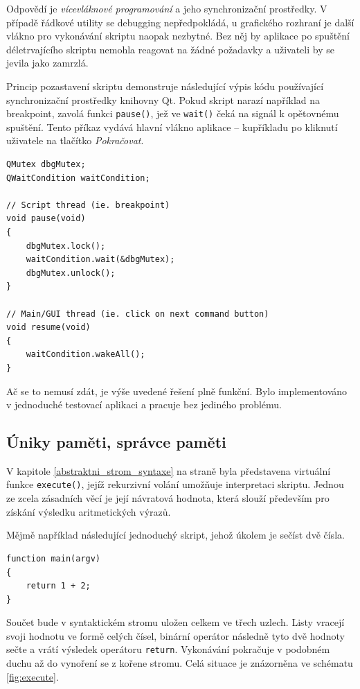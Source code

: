 \documentclass[11pt,twoside,a4paper]{book}
\begin{document}
Odpovědí je \textit{vícevláknové programování} a jeho synchronizační prostředky. V případě řádkové utility se debugging nepředpokládá, u grafického rozhraní je další vlákno pro vykonávání skriptu naopak nezbytné. Bez něj by aplikace po spuštění déletrvajícího skriptu nemohla reagovat na žádné požadavky a uživateli by se jevila jako zamrzlá.

Princip pozastavení skriptu demonstruje následující výpis kódu používající synchronizační prostředky knihovny Qt. Pokud skript narazí například na breakpoint, zavolá funkci \texttt{pause()}, jež ve \texttt{wait()} čeká na signál k opětovnému spuštění. Tento příkaz vydává hlavní vlákno aplikace -- kupříkladu po kliknutí uživatele na tlačítko \textit{Pokračovat}.

\begin{verbatim}
QMutex dbgMutex;
QWaitCondition waitCondition;

// Script thread (ie. breakpoint)
void pause(void)
{
    dbgMutex.lock();
    waitCondition.wait(&dbgMutex);
    dbgMutex.unlock();
}

// Main/GUI thread (ie. click on next command button)
void resume(void)
{
    waitCondition.wakeAll();
}
\end{verbatim}

Ač se to nemusí zdát, je výše uvedené řešení plně funkční. Bylo implementováno v jednoduché testovací aplikaci a pracuje bez jediného problému.


\subsection{Úniky paměti, správce paměti}

V kapitole \ref{abstraktni_strom_syntaxe} na straně \pageref{abstraktni_strom_syntaxe} byla představena virtuální funkce \texttt{execute()}, jejíž rekurzivní volání umožňuje interpretaci skriptu. Jednou ze zcela zásadních věcí je její návratová hodnota, která slouží především pro získání výsledku aritmetických výrazů.

Mějmě například následující jednoduchý skript, jehož úkolem je sečíst dvě čísla.

\begin{verbatim}
function main(argv)
{
    return 1 + 2;
}
\end{verbatim}

Součet bude v syntaktickém stromu uložen celkem ve třech uzlech. Listy vracejí svoji hodnotu ve formě celých čísel, binární operátor následně tyto dvě hodnoty sečte a vrátí výsledek operátoru \texttt{return}. Vykonávání pokračuje v podobném duchu až do vynoření se z kořene stromu. Celá situace je znázorněna ve schématu \ref{fig:execute}.
\end{document}
